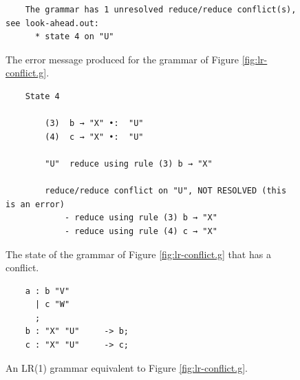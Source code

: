 \begin{figure}[!ht]
\centering
\begin{verbatim}
    The grammar has 1 unresolved reduce/reduce conflict(s), see look-ahead.out:
      * state 4 on "U"
\end{verbatim}
\vspace*{-0.3cm}
\caption{The error message produced for the grammar of Figure \ref{fig:lr-conflict.g}.}
\label{fig:Look-Ahead.error}
\end{figure}

\begin{figure}[!ht]
\centering
\begin{verbatim}
    State 4

        (3)  b → "X" •:  "U"
        (4)  c → "X" •:  "U"

        "U"  reduce using rule (3) b → "X"

        reduce/reduce conflict on "U", NOT RESOLVED (this is an error)
            - reduce using rule (3) b → "X"
            - reduce using rule (4) c → "X"
\end{verbatim}
\vspace*{-0.3cm}
\caption{The state of the grammar of Figure \ref{fig:lr-conflict.g} that has a conflict.}
\label{fig:Look-Ahead.state4}
\end{figure}

\begin{figure}[!ht]
\centering
\begin{verbatim}
    a : b "V"
      | c "W"
      ;
    b : "X" "U"     -> b;
    c : "X" "U"     -> c;
\end{verbatim}
\vspace*{-0.3cm}
\caption{An LR(1) grammar equivalent to Figure \ref{fig:lr-conflict.g}.}
\label{fig:lr-conflict-resolved.g}
\end{figure}


